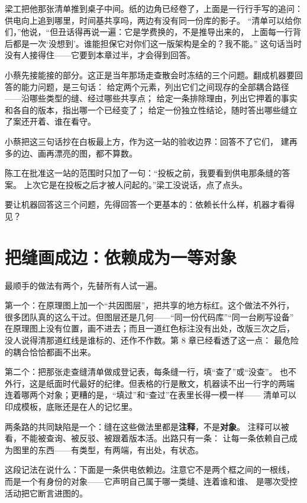 梁工把他那张清单推到桌子中间。纸的边角已经卷了，上面是一行行手写的追问：
供电向上追到哪里，时间基共享吗，两边有没有同一份库的影子。
“清单可以给你们，”他说，“但丑话得再说一遍：它是学费换的，不是推导出来的，
上面每一行背后都是一次‘没想到’。谁能担保它对你们这一版架构是全的？我不能。”
这句话当时没有人接得住——它要到本章过半，才会得到回答。

小蔡先接能接的部分。这正是当年那场走查散会时冻结的三个问题。翻成机器要回答的能力问题，是三句话：
给定两个元素，列出它们之间现存的全部耦合路径——沿哪些类型的缝、经过哪些共享点；
给定一条排除理由，列出它押着的事实和各自的版本，指出哪一个已经变了；
给定一份独立性结论，随时答出哪些缝立了案还开着、谁在看守。

小蔡把这三句话抄在白板最上方，作为这一站的验收边界：回答不了它们，
建再多的边、画再漂亮的图，都不算数。

陈工在批准这一站的范围时只加了一句：“投板之前，我要看到供电那条缝的答案。
上次它是在投板之后才被人问起的。”梁工没说话，点了点头。

要让机器回答这三个问题，先得回答一个更基本的：依赖长什么样，机器才看得见？

\section{把缝画成边：依赖成为一等对象}

最顺手的做法有两个，先替所有人试一遍。

第一个：在原理图上加一个“共因图层”，把共享的地方标红。这个做法不外行，
很多团队真的这么干过。但图层还是几何——“同一份代码库”“同一台刷写设备”
在原理图上没有位置，画不进去；而且一道红色标注没有出处，改版三次之后，
没人说得清那道红线是谁标的、还作不作数。第 8 章已经看透了这一点：
最危险的耦合恰恰都画不出来。

第二个：把那张走查缝清单做成登记表，每条缝一行，填“查了”或“没查”。
也不外行，这是纸面时代最好的纪律。但表格的行是散文，机器读不出一行字的两端
连着哪两个对象；更糟的是，“填过”和“查过”在表里长得一模一样——
清单可以印成模板，底账还是在人的记忆里。

两条路的共同缺陷是一个：缝在这些做法里都是\textbf{注释}，不是\textbf{对象}。
注释可以被看，不能被查询、被反驳、被跟着版本活。出路只有一条：
让每一条依赖自己成为图里的东西——有类型，有两端，有出处，有状态。

这段记法在说什么：下面是一条供电依赖边。注意它不是两个框之间的一根线，
而是一个有身份的对象——它声明自己属于哪一类缝、连着谁和谁、
是哪次受控活动把它断言进图的。


